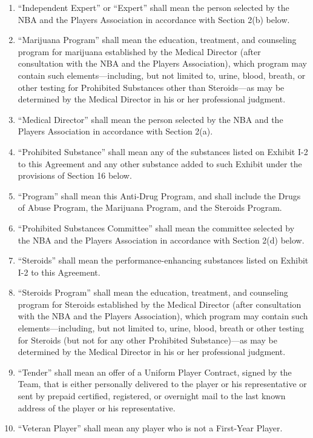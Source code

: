 \documentclass[
]{book}
\begin{document}
\begin{enumerate}
\item
  ``Independent Expert'' or ``Expert'' shall mean the person selected by the NBA and the Players Association in accordance with Section 2(b) below.
\item
  ``Marijuana Program'' shall mean the education, treatment, and counseling program for marijuana established by the Medical Director (after consultation with the NBA and the Players Association), which program may contain such elements---including, but not limited to, urine, blood, breath, or other testing for Prohibited Substances other than Steroids---as may be determined by the Medical Director in his or her professional judgment.
\item
  ``Medical Director'' shall mean the person selected by the NBA and the Players Association in accordance with Section 2(a).
\item
  ``Prohibited Substance'' shall mean any of the substances listed on Exhibit I-2 to this Agreement and any other substance added to such Exhibit under the provisions of Section 16 below.
\item
  ``Program'' shall mean this Anti-Drug Program, and shall include the Drugs of Abuse Program, the Marijuana Program, and the Steroids Program.
\item
  ``Prohibited Substances Committee'' shall mean the committee selected by the NBA and the Players Association in accordance with Section 2(d) below.
\item
  ``Steroids'' shall mean the performance-enhancing substances listed on Exhibit I-2 to this Agreement.
\item
  ``Steroids Program'' shall mean the education, treatment, and counseling program for Steroids established by the Medical Director (after consultation with the NBA and the Players Association), which program may contain such elements---including, but not limited to, urine, blood, breath or other testing for Steroids (but not for any other Prohibited Substance)---as may be determined by the Medical Director in his or her professional judgment.
\item
  ``Tender'' shall mean an offer of a Uniform Player Contract, signed by the Team, that is either personally delivered to the player or his representative or sent by prepaid certified, registered, or overnight mail to the last known address of the player or his representative.
\item
  ``Veteran Player'' shall mean any player who is not a First-Year Player.
\end{enumerate}
\end{document}
